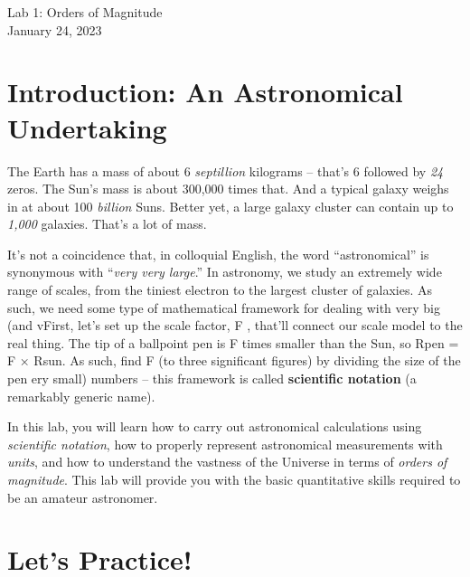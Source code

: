 \documentclass[11pt]{article}
\begin{document}
\begin{center}
\huge{Lab 1: Orders of Magnitude}\\ \medskip \Large{January 24, 2023}
\end{center}


\section{Introduction: An Astronomical Undertaking}

The Earth has a mass of about 6 \emph{septillion} kilograms -- that's 6 followed by \emph{24} zeros. The Sun's mass is about 300,000 times that. And a typical galaxy weighs in at about 100 \emph{billion} Suns. Better yet, a large galaxy cluster can contain up to \emph{1,000} galaxies. That's a lot of mass.

\medskip \noindent
It's not a coincidence that, in colloquial English, the word ``astronomical'' is synonymous with ``\emph{very very large}.'' In astronomy, we study an extremely wide range of scales, from the tiniest electron to the largest cluster of galaxies. As such, we need some type of mathematical framework for dealing with very big (and vFirst, let’s set up the scale factor, F , that’ll connect our scale model to the real thing. The
tip of a ballpoint pen is F times smaller than the Sun, so
Rpen = F × Rsun.
As such, find F (to three significant figures) by dividing the size of the pen ery small) numbers -- this framework is called \textbf{scientific notation} (a remarkably generic name). 

\medskip \noindent
In this lab, you will learn how to carry out astronomical calculations using \emph{scientific notation}, how to properly represent astronomical measurements with \emph{units}, and how to understand the vastness of the Universe in terms of \emph{orders of magnitude}. This lab will provide you with the basic quantitative skills required to be an amateur astronomer.

\bigskip


\section{Let's Practice!}
\end{document}
